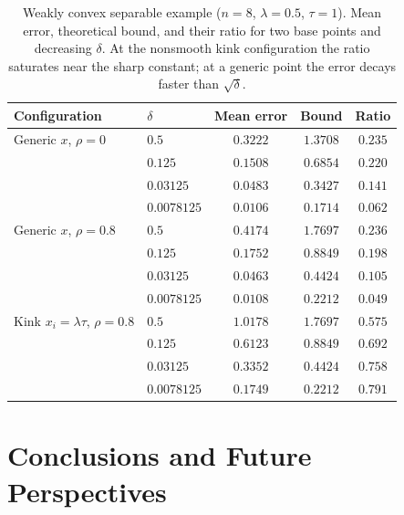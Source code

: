 \documentclass[11pt]{article}
\newcommand{\1}{\mathds{1}}
\theoremstyle{definition}
\theoremstyle{remark}
\theoremstyle{definition}
\begin{document}
\begin{table}[htbp]
\centering
\caption{Weakly convex separable example ($n=8$, $\lambda=0.5$, $\tau=1$). Mean error, theoretical bound, and their ratio for two base points and decreasing $\delta$. At the nonsmooth kink configuration the ratio saturates near the sharp constant; at a generic point the error decays faster than $\sqrt\delta$.}
\label{tab:weakly}
\begin{tabular}{@{}llccc@{}}
\toprule
 {Configuration} &  {$\delta$} &  {Mean error} &  {Bound} &  {Ratio} \\
\midrule
 {Generic $x$, $\rho=0$}        &  {$0.5$}      &  {$0.3222$} &  {$1.3708$} &  {$0.235$} \\
 {}                             &  {$0.125$}    &  {$0.1508$} &  {$0.6854$} &  {$0.220$} \\
 {}                             &  {$0.03125$}  &  {$0.0483$} &  {$0.3427$} &  {$0.141$} \\
 {}                             &  {$0.0078125$}&  {$0.0106$} &  {$0.1714$} &  {$0.062$} \\
\midrule
 {Generic $x$, $\rho=0.8$}      &  {$0.5$}      &  {$0.4174$} &  {$1.7697$} &  {$0.236$} \\
 {}                             &  {$0.125$}    &  {$0.1752$} &  {$0.8849$} &  {$0.198$} \\
 {}                             &  {$0.03125$}  &  {$0.0463$} &  {$0.4424$} &  {$0.105$} \\
 {}                             &  {$0.0078125$}&  {$0.0108$} &  {$0.2212$} &  {$0.049$} \\
\midrule
 {Kink $x_i=\lambda\tau$, $\rho=0.8$} &  {$0.5$}      &  {$1.0178$} &  {$1.7697$} &  {$0.575$} \\
 {}                             &  {$0.125$}    &  {$0.6123$} &  {$0.8849$} &  {$0.692$} \\
 {}                             &  {$0.03125$}  &  {$0.3352$} &  {$0.4424$} &  {$0.758$} \\
 {}                             &  {$0.0078125$}&  {$0.1749$} &  {$0.2212$} &  {$0.791$} \\
\bottomrule
\end{tabular}
\end{table}

\section{Conclusions and Future Perspectives}
\end{document}
